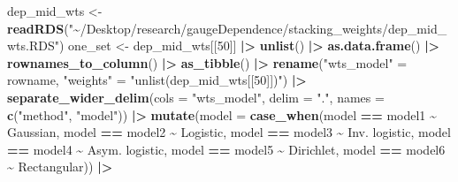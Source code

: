 \documentclass[
]{article}
\newenvironment{Shaded}{\begin{snugshade}}{\end{snugshade}}
\newcommand{\AttributeTok}[1]{\textcolor[rgb]{0.13,0.29,0.53}{#1}}
\newcommand{\DecValTok}[1]{\textcolor[rgb]{0.00,0.00,0.81}{#1}}
\newcommand{\FunctionTok}[1]{\textcolor[rgb]{0.13,0.29,0.53}{\textbf{#1}}}
\newcommand{\NormalTok}[1]{#1}
\newcommand{\OtherTok}[1]{\textcolor[rgb]{0.56,0.35,0.01}{#1}}
\newcommand{\SpecialCharTok}[1]{\textcolor[rgb]{0.81,0.36,0.00}{\textbf{#1}}}
\newcommand{\StringTok}[1]{\textcolor[rgb]{0.31,0.60,0.02}{#1}}
\begin{document}
\begin{Shaded}
\begin{Highlighting}[]
\NormalTok{dep\_mid\_wts }\OtherTok{\textless{}{-}} \FunctionTok{readRDS}\NormalTok{(}\StringTok{"\textasciitilde{}/Desktop/research/gaugeDependence/stacking\_weights/dep\_mid\_wts.RDS"}\NormalTok{)}
\NormalTok{one\_set }\OtherTok{\textless{}{-}}\NormalTok{ dep\_mid\_wts[[}\DecValTok{50}\NormalTok{]] }\SpecialCharTok{|\textgreater{}} \FunctionTok{unlist}\NormalTok{() }\SpecialCharTok{|\textgreater{}} 
  \FunctionTok{as.data.frame}\NormalTok{() }\SpecialCharTok{|\textgreater{}} 
  \FunctionTok{rownames\_to\_column}\NormalTok{() }\SpecialCharTok{|\textgreater{}} 
  \FunctionTok{as\_tibble}\NormalTok{() }\SpecialCharTok{|\textgreater{}}
  \FunctionTok{rename}\NormalTok{(}\StringTok{"wts\_model"} \OtherTok{=}\NormalTok{ rowname, }\StringTok{"weights"} \OtherTok{=} \StringTok{"unlist(dep\_mid\_wts[[50]])"}\NormalTok{) }\SpecialCharTok{|\textgreater{}}
  \FunctionTok{separate\_wider\_delim}\NormalTok{(}\AttributeTok{cols =} \StringTok{"wts\_model"}\NormalTok{, }\AttributeTok{delim =} \StringTok{"."}\NormalTok{, }\AttributeTok{names =} \FunctionTok{c}\NormalTok{(}\StringTok{"method"}\NormalTok{, }\StringTok{"model"}\NormalTok{)) }\SpecialCharTok{|\textgreater{}}
  \FunctionTok{mutate}\NormalTok{(}\AttributeTok{model =} \FunctionTok{case\_when}\NormalTok{(model }\SpecialCharTok{==} \StringTok{\textquotesingle{}model1\textquotesingle{}} \SpecialCharTok{\textasciitilde{}} \StringTok{\textquotesingle{}Gaussian\textquotesingle{}}\NormalTok{,}
\NormalTok{                           model }\SpecialCharTok{==} \StringTok{\textquotesingle{}model2\textquotesingle{}} \SpecialCharTok{\textasciitilde{}} \StringTok{\textquotesingle{}Logistic\textquotesingle{}}\NormalTok{,}
\NormalTok{                           model }\SpecialCharTok{==} \StringTok{\textquotesingle{}model3\textquotesingle{}} \SpecialCharTok{\textasciitilde{}} \StringTok{\textquotesingle{}Inv. logistic\textquotesingle{}}\NormalTok{,}
\NormalTok{                           model }\SpecialCharTok{==} \StringTok{\textquotesingle{}model4\textquotesingle{}} \SpecialCharTok{\textasciitilde{}} \StringTok{\textquotesingle{}Asym. logistic\textquotesingle{}}\NormalTok{,}
\NormalTok{                           model }\SpecialCharTok{==} \StringTok{\textquotesingle{}model5\textquotesingle{}} \SpecialCharTok{\textasciitilde{}} \StringTok{\textquotesingle{}Dirichlet\textquotesingle{}}\NormalTok{,}
\NormalTok{                           model }\SpecialCharTok{==} \StringTok{\textquotesingle{}model6\textquotesingle{}} \SpecialCharTok{\textasciitilde{}} \StringTok{\textquotesingle{}Rectangular\textquotesingle{}}\NormalTok{)) }\SpecialCharTok{|\textgreater{}}

\end{Highlighting}
\end{Shaded}
\end{document}
